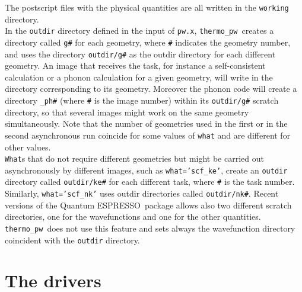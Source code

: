 \documentclass[12pt,a4paper]{article}
\def\qe{{\sc Quantum ESPRESSO}}
\def\thermo{{\texttt{thermo\_pw}}}
\begin{document}
The postscript files with the physical quantities are all written in
the \texttt{working} directory. \\
In the \texttt{outdir} directory defined in the input of \texttt{pw.x},
\thermo\ creates a directory called \texttt{g\#} for each geometry, 
where \texttt{\#} indicates the geometry number, and uses the directory 
\texttt{outdir/g\#} as the outdir directory for each different geometry. 
An image that receives the task, for instance a self-consistent calculation 
or a phonon calculation for a given geometry, will write in the directory 
corresponding to its geometry.
Moreover the phonon code will create a directory \texttt{\_ph\#} 
(where \texttt{\#} is the image number) within its \texttt{outdir/g\#} scratch 
directory, so that several images might work on the same geometry 
simultaneously.
Note that the number of geometries used in the first or in the second
asynchronous run coincide for some values of \texttt{what} and are
different for other values. \\
\texttt{What}s that do not require different geometries but might be carried
out asynchronously by different images, such as \texttt{what='scf\_ke'}, 
create an \texttt{outdir} directory called
\texttt{outdir/ke\#} for each different task, where \texttt{\#} is the
task number. Similarly, \texttt{what='scf\_nk'} uses outdir directories
called \texttt{outdir/nk\#}.
Recent versions of the \qe\ package allows also two different scratch
directories, one for the wavefunctions and one for the other quantities.
\thermo\ does not use this feature and sets always the wavefunction
directory coincident with the \texttt{outdir} directory.

\newpage
\section{\color{coral}The drivers}
\end{document}
